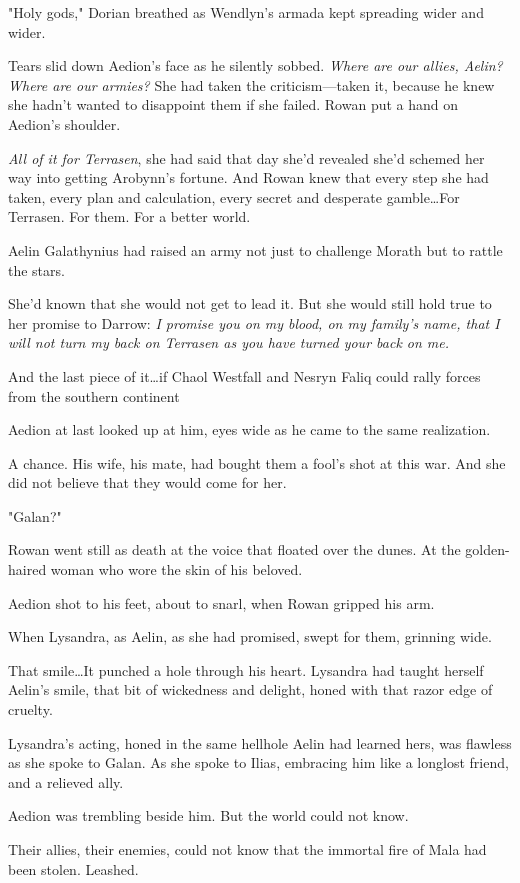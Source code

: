 "Holy gods," Dorian breathed as Wendlyn's armada kept spreading wider and wider.

Tears slid down Aedion's face as he silently sobbed.
\emph{Where are our allies, Aelin?
Where are our armies?} She had taken the criticism---taken it, because he knew she hadn't wanted to disappoint them if she failed.
Rowan put a hand on Aedion's shoulder.

\emph{All of it for Terrasen}, she had said that day she'd revealed she'd schemed her way into getting Arobynn's fortune.
And Rowan knew that every step she had taken, every plan and calculation, every secret and desperate gamble\ldots For Terrasen.
For them.
For a better world.

Aelin Galathynius had raised an army not just to challenge Morath  but to rattle the stars.

She'd known that she would not get to lead it.
But she would still hold true to her promise to Darrow: \emph{I promise you on my blood, on my family's name, that I will not turn my back on Terrasen as you have turned your back on me.}

And the last piece of it\ldots if Chaol Westfall and Nesryn Faliq could rally forces from the southern continent 

Aedion at last looked up at him, eyes wide as he came to the same realization.

A chance.
His wife, his mate, had bought them a fool's shot at this war.
And she did not believe that they would come for her.

"Galan?"

Rowan went still as death at the voice that floated over the dunes.
At the golden-haired woman who wore the skin of his beloved.

Aedion shot to his feet, about to snarl, when Rowan gripped his arm.

When Lysandra, as Aelin, as she had promised, swept for them, grinning wide.

That smile\ldots It punched a hole through his heart.
Lysandra had taught herself Aelin's smile, that bit of wickedness and delight, honed with that razor edge of cruelty.

Lysandra's acting, honed in the same hellhole Aelin had learned hers, was flawless as she spoke to Galan.
As she spoke to Ilias, embracing him like a longlost friend, and a relieved ally.

Aedion was trembling beside him.
But the world could not know.

Their allies, their enemies, could not know that the immortal fire of Mala had been stolen.
Leashed.

